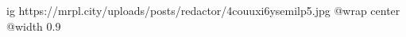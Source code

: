  
 
 
 
 

\ifcmt
  ig https://mrpl.city/uploads/posts/redactor/4couuxi6ysemilp5.jpg
  @wrap center
  @width 0.9
\fi
